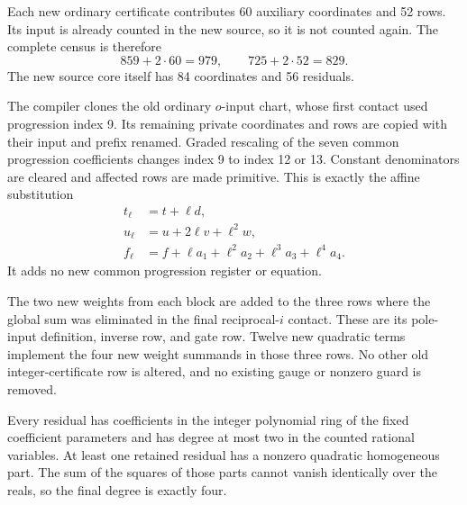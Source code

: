 Each new ordinary certificate contributes 60 auxiliary coordinates
and 52 rows. Its input is already counted in the new source, so it
is not counted again. The complete census is therefore
\[
               859+2\cdot60=979,\qquad
               725+2\cdot52=829.
\]
The new source core itself has 84 coordinates and 56 residuals.

The compiler clones the old ordinary \(o\)-input chart, whose first
contact used progression index 9. Its remaining private coordinates
and rows are copied with their input and prefix renamed. Graded
rescaling of the seven common progression coefficients changes index
9 to index 12 or 13. Constant denominators are cleared and affected
rows are made primitive. This is exactly the affine substitution
\[
 \begin{aligned}
 t_\ell&=t+\ell d,\\
 u_\ell&=u+2\ell v+\ell^2w,\\
 f_\ell&=f+\ell a_1+\ell^2a_2+\ell^3a_3+\ell^4a_4.
 \end{aligned}
\]
It adds no new common progression register or equation.

The two new weights from each block are added to the three rows
where the global sum was eliminated in the final reciprocal-\(i\)
contact. These are its pole-input definition, inverse row, and gate
row. Twelve new quadratic terms implement the four new weight
summands in those three rows. No other old integer-certificate row
is altered, and no existing gauge or nonzero guard is removed.

Every residual has coefficients in the integer polynomial ring of
the fixed coefficient parameters and has degree at most two in the
counted rational variables. At least one retained residual has a
nonzero quadratic homogeneous part. The sum of the squares of those
parts cannot vanish identically over the reals, so the final degree
is exactly four.

